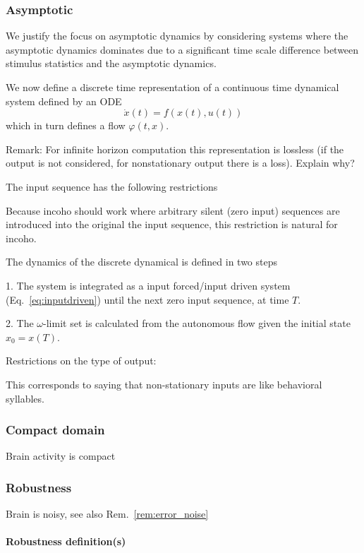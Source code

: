 \documentclass{scrartcl}
\theoremstyle{definition}
\theoremstyle{remark}
\begin{document}
\subsubsection{Asymptotic}
We justify the focus on asymptotic dynamics by considering systems where the asymptotic dynamics dominates due to a significant time scale difference between stimulus statistics and the asymptotic dynamics.


We now define a discrete time representation of a continuous time dynamical system defined by an ODE
\begin{equation}\label{eq:inputdriven}
\dot x(t) = f(x(t), u(t))
\end{equation}
which in turn defines a flow $\varphi(t,x)$.

Remark: For infinite horizon computation this representation is lossless (if the output is not considered, for nonstationary output there is a loss).
Explain why?

The input sequence has the following restrictions

Because incoho should work where arbitrary silent (zero input) sequences are introduced into the original the input sequence, this restriction is natural for incoho.

The dynamics of the discrete dynamical is defined in two steps

1. The system is integrated as a input forced/input driven system (Eq.~\ref{eq:inputdriven}) until the next zero input sequence, at time $T$.

2. The $\omega$-limit set is calculated from the autonomous flow given the initial state $x_0=x(T)$.



Restrictions on the type of output: 

This corresponds to saying that non-stationary inputs are like behavioral syllables.


\subsubsection{Compact domain}
Brain activity is compact

\subsubsection{Robustness}
Brain is noisy, see also Rem.~\ref{rem:error_noise}

\paragraph{Robustness definition(s)}
\end{document}
